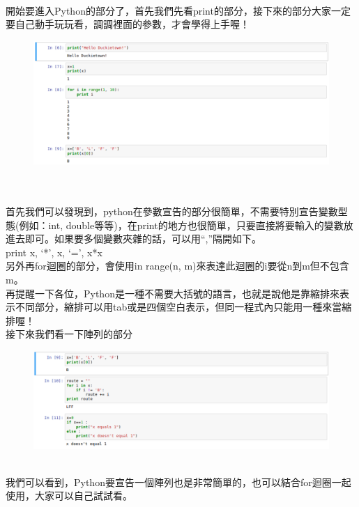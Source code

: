 \documentclass{article}
\begin{document}
\\開始要進入Python的部分了，首先我們先看print的部分，接下來的部分大家一定要自己動手玩玩看，調調裡面的參數，才會學得上手喔！
\\
\begin{figure}[htp]
    \begin{center}
        \includegraphics[width=450pt]{pic/3_1_2.png}
    \end{center}
\end{figure}
\\
\\首先我們可以發現到，python在參數宣告的部分很簡單，不需要特別宣告變數型態(例如：int, double等等)，在print的地方也很簡單，只要直接將要輸入的變數放進去即可。如果要多個變數夾雜的話，可以用“,”隔開如下。
\\print x, ‘*’, x, ‘=’, x*x
\\另外再for迴圈的部分，會使用in range(n, m)來表達此迴圈的i要從n到m但不包含m。
\\再提醒一下各位，Python是一種不需要大括號的語言，也就是說他是靠縮排來表示不同部分，縮排可以用tab或是四個空白表示，但同一程式內只能用一種來當縮排喔！
\\接下來我們看一下陣列的部分
\\
\begin{figure}[htp]
    \begin{center}
        \includegraphics[width=450pt]{pic/3_1_3.png}
    \end{center}
\end{figure}
\\
我們可以看到，Python要宣告一個陣列也是非常簡單的，也可以結合for迴圈一起使用，大家可以自己試試看。
\end{document}
